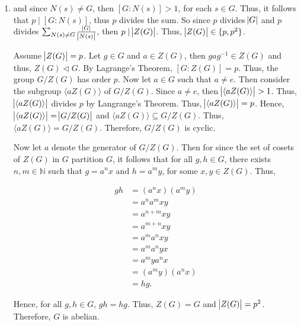 \documentclass[12pt]{article}
\makeatletter
\theoremstyle{definition}
\theoremstyle{remark}
\renewenvironment{proof}[1][\proofname]{\par
  \pushQED{\qed}%
  \normalfont \topsep6\p@\@plus6\p@\relax
  \list{}{\leftmargin=0mm
          \rightmargin=4mm
          \settowidth{\itemindent}{\itshape#1}%
          \labelwidth=\itemindent
          \parsep=0pt \listparindent=\parindent 
  }
  \item[\hskip\labelsep
        \itshape
    #1\@addpunct{.}]\ignorespaces
}{%
  \popQED\endlist\@endpefalse
}
\let\oldproofname=\proofname
\renewcommand{\proofname}{\bf{\textit{\oldproofname}}}
\makeatother
\begin{document}
\begin{enumerate}[leftmargin=*]
\begin{proof}
                and since $N(s)\neq G$, then $[G\colon N(s)]>1$, for each $s\in G$. Thus, it follows that $p\mid[G\colon N(s)]$, thus $p$ divides the sum. So since $p$ divides $\abs{G}$ and $p$ divides $\sum_{N(s)\neq G}\frac{\abs{G}}{\abs{N(s)}}$, then $p\mid\abs{Z(G)}$. Thus, $\abs{Z(G)}\in\{p,p^2\}$.\par\hspace{4mm} Assume $\abs{Z(G)}=p$. Let $g\in G$ and $a\in Z(G)$, then $gag^{-1}\in Z(G)$ and thus, $Z(G)\triangleleft G$. By Lagrange's Theorem, $[G\colon Z(G)]=p$. Thus, the group $G/Z(G)$ has order $p$. Now let $a\in G$ such that $a\neq e$. Then consider the subgroup $\langle aZ(G)\rangle$ of $G/Z(G)$. Since $a\neq e$, then $\abs{\langle aZ(G)\rangle}>1$. Thus, $\abs{\langle aZ(G)\rangle}$ divides $p$ by Langrange's Theorem. Thus, $\abs{\langle aZ(G)\rangle}=p$.  Hence, $\abs{\langle aZ(G)\rangle}=\abs{G/Z(G)}$ and $\langle aZ(G)\rangle\subseteq G/Z(G)$. Thus, $\langle aZ(G)\rangle =G/Z(G)$. Therefore, $G/Z(G)$ is cyclic.\par\hspace{4mm} Now let $a$ denote the generator of $G/Z(G)$. Then for since the set of cosets of $Z(G)$ in $G$ partition $G$, it follows that for all $g,h\in G$, there exists $n,m\in\mathbb{N}$ such that $g=a^nx$ and $h=a^my$, for some $x,y\in Z(G)$. Thus, 
                
                \begin{equation*}
                    \begin{split}
                        gh&=(a^nx)(a^my) \\
                          &= a^na^mxy \\
                          &= a^{n+m}xy \\
                          &= a^{m+n}xy \\
                          &= a^ma^nxy \\
                          &= a^ma^nyx \\
                          &= a^mya^nx \\
                          &= (a^my)(a^nx) \\
                          &= hg.
                    \end{split}
                \end{equation*}
                
                Hence, for all $g,h\in G$, $gh=hg$. Thus, $Z(G)=G$ and $\abs{Z(G)}=p^2$. Therefore, $G$ is abelian.
            \end{proof}
            

\end{enumerate}
\end{document}
